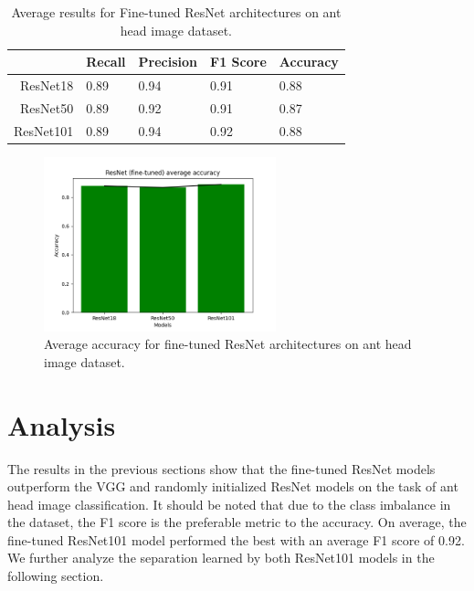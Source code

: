 \documentclass{aci}
\numberwithin{equation}{section}
\begin{document}
\vspace{0.5in}

\begin{table}[h]
    \centering
    \caption{Average results for Fine-tuned ResNet architectures on ant head image dataset.}
    \begin{tabular}{r|llll}
                  & Recall & Precision & F1 Score & Accuracy \\
        \hline
        ResNet18  & 0.89   & 0.94      & 0.91     & 0.88     \\
        ResNet50  & 0.89   & 0.92      & 0.91     & 0.87     \\
        ResNet101 & 0.89   & 0.94      & 0.92     & 0.88     \\
    \end{tabular}
    \label{tab:fresnet_results}
\end{table}

\begin{figure}[h]
    \centering
    \includegraphics[width=0.6\textwidth]{thesis_assets/plots/resnet_finetuned_average.png}
    \caption{Average accuracy for fine-tuned ResNet architectures on ant head image dataset.}
    \label{fig:fresnet_results}
\end{figure}

\clearpage

\section{Analysis}

The results in the previous sections show that the fine-tuned ResNet models
outperform the VGG and randomly initialized ResNet models on the task of ant
head image classification. It should be noted that due to the class imbalance in
the dataset, the F1 score is the preferable metric to the accuracy. On average,
the fine-tuned ResNet101 model performed the best with an average F1 score of
0.92. We further analyze the separation learned by both ResNet101 models in the
following section.
\end{document}
